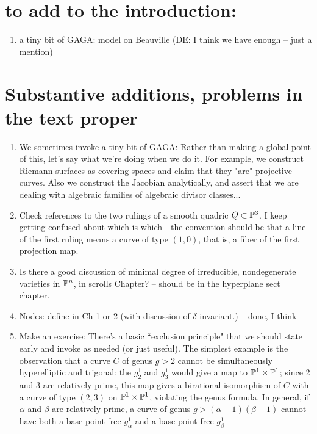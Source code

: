 \documentclass[12pt, leqno]{book}
\begin{document}
\section {to add to the introduction:}
\begin{enumerate}

\item a tiny bit of GAGA: model on Beauville (DE: I think we have enough -- just a mention)
 \end{enumerate}
 

\section{Substantive additions, problems in the text proper}


\begin{enumerate}
 
 \item We sometimes invoke a tiny bit of GAGA: Rather than making a global point of this, let's say what we're doing when we do it. For example, we construct Riemann surfaces
 as covering spaces and claim that they "are" projective curves. Also we construct the Jacobian analytically, and assert that
 we are dealing with algebraic families of algebraic divisor classes...
   
\item Check references to the two rulings of a smooth quadric $Q \subset \PP^3$. I keep getting confused about which is which---the convention should be that a line of the first ruling means a curve of type $(1,0)$, that is, a fiber of the first projection map.

\item Is there a good discussion of minimal degree of irreducible, nondegenerate varieties in $\PP^n$, in scrolls Chapter? -- should be in the hyperplane sect chapter.

\item Nodes: define in Ch 1 or 2 (with discussion of $\delta$ invariant.) -- done, I think


\item Make an exercise: There's a basic ``exclusion principle" that we should state early and invoke as needed (or just useful). The simplest example is the observation that a curve $C$ of genus $g > 2$ cannot be simultaneously hyperelliptic and trigonal: the $g^1_2$ and $g^1_3$ would give a map to $\PP^1 \times \PP^1$; since 2 and 3 are relatively prime, this map gives a birational isomorphism of $C$ with a curve of type $(2,3)$ on $\PP^1 \times \PP^1$, violating the genus formula. In general, if $\alpha$ and $\beta$ are relatively prime, a curve of genus $g > (\alpha - 1)(\beta - 1)$ cannot have both a base-point-free $g^1_\alpha$ and a base-point-free $g^1_\beta$



\end{enumerate}
\end{document}
